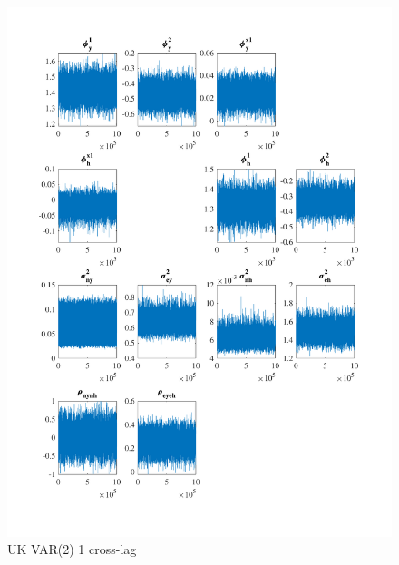 \documentclass[
  12pt,
]{article}
\begin{document}
\begin{figure}

{\centering \includegraphics[width=0.85\linewidth]{../../Regression/Bayesian_UC_VAR2_drift_Crosscycle1lag/OutputData/posteriorchain_UK} 

}

\caption{UK VAR(2) 1 cross-lag}\label{fig:unnamed-chunk-16}
\end{figure}
\end{document}
